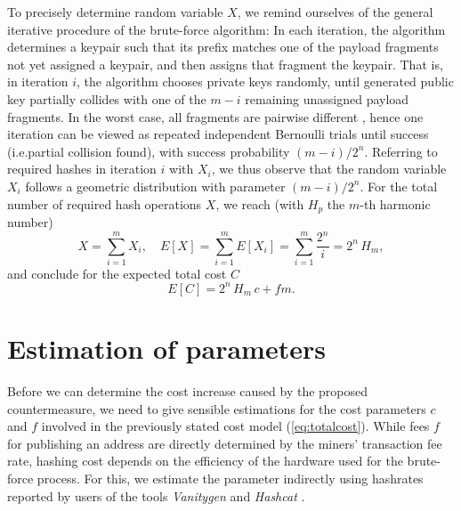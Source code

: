 \documentclass[a4paper,11pt,titlepage]{scrbook}
\begin{document}
To precisely determine random variable $X$, we remind ourselves of the general iterative procedure of the brute-force algorithm:
In each iteration, the algorithm determines a keypair such that its prefix matches one of the payload fragments not yet assigned a keypair, and then assigns that fragment the keypair.
That is, in iteration $i$, the algorithm chooses private keys randomly, until generated public key partially collides with one of the $m-i$ remaining unassigned payload fragments.
In the worst case, all fragments are pairwise different%
, hence one iteration can be viewed as repeated independent Bernoulli trials until success (i.e.\@ partial collision found), with success probability $(m-i)/2^n$.  
Referring to required hashes in iteration $i$ with $X_i$, we thus observe that the random variable $X_i$ follows a geometric distribution with parameter $(m-i)/2^n$.
For the total number of required hash operations $X$, we reach (with $H_p$ the $m$-th harmonic number)
\[ X = \sum_{i=1}^{m} X_i, \quad E[X] = \sum_{i=1}^{m} E[X_i] = \sum_{i=1}^{m}\frac{2^n}{i} = 2^n\, H_m, \]
and conclude for the expected total cost $C$
\begin{equation}
    E[C] = 2^n\, H_m\,c + fm.\label{eq:totalcost}
\end{equation}


\section{Estimation of parameters}\label{sec:parameters}



Before we can determine the cost increase caused by the proposed countermeasure, we need to give sensible estimations for the cost parameters $c$ and $f$ involved in the previously stated cost model (\ref{eq:totalcost}).
While fees $f$ for publishing an address are directly determined by the miners' transaction fee rate, hashing cost depends on the efficiency of the hardware used for the brute-force process.
For this, we estimate the parameter indirectly using hashrates reported by users of the tools \emph{Vanitygen} \cite{vanitygen_2012} and \emph{Hashcat} \cite{hashcat_2020}.
\end{document}
